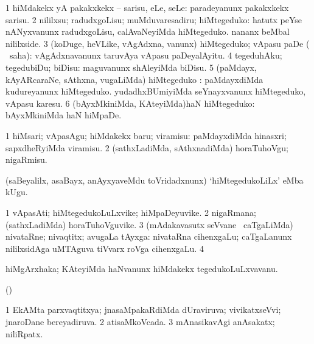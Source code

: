 {{{{{{\bentry
{} 
\gl{\sakirx}
\expl{}
\bmng
\bnum
\num{1} hiMdakekx yA pakakxkekx -- sarisu, eLe, seLe:  paradeyanunx pakakxkekx sarisu. 
\num{2} nililxsu; radudxgoLisu; muMduvaresadiru; hiMtegeduko:  hatutx peYse nANyxvanunx radudxgoLisu, calAvaNeyiMda hiMtegeduko.  nananx beMbal nililxside. 
\num{3} (koDuge, heVLike, vAgAdxna, \mo vanunx) hiMtegeduko; vApasu paDe ( \akirx\ saha):  vAgAdxnavanunx taruvAya vApasu paDeyalAyitu. 
\num{4} tegeduhAku; tegedubiDu; biDisu:  maguvanunx shAleyiMda biDisu. 
\num{5} (paMdayx, kAyARcaraNe, sAthxna, \mo vugaLiMda) hiMtegeduko :  paMdayxdiMda kudureyanunx hiMtegeduko.  yudadhxBUmiyiMda seYnayxvanunx hiMtegeduko, vApasu karesu. 
\num{6} (bAyxMkiniMda, KAteyiMda)haN hiMtegeduko:  bAyxMkiniMda haN hiMpaDe. 
\enum
\emng

\noindent
\gl{\akirx}
\expl{}
\bmng
\bnum
\num{1} hiMsari; vApasAgu; hiMdakekx baru; viramisu:  paMdayxdiMda hinasxri; sapxdheRyiMda viramisu. 
\num{2} (sathxLadiMda, sAthxnadiMda) horaTuhoVgu; nigaRmisu. 
\enum
\emng

\noindent
\gl{\pagu}
\expl{}
\bmng
{} (saBeyalilx, asaBayx, anAyxyaveMdu toVridadxnunx) `hiMtegedukoLiLx' eMba kUgu. 
\emng
\eentry

\bentry 
{} 
\gl{\nA}
\expl{}
\bmng
\bnum
\num{1} vApasAti; hiMtegedukoLuLxvike; hiMpaDeyuvike. 
\num{2} nigaRmana; (sathxLadiMda) horaTuhoVguvike. 
\num{3} (mAdakavasutx seVvane \mo\ caTgaLiMda) nivataRne; nivaqtitx; avugaLa tAyxga:  nivataRna cihenxgaLu; caTgaLanunx nililxsidAga uMTAguva tiVvarx roVga cihenxgaLu. 
\num{4}  
\enum
\emng
\eentry

\bentry
{} 
\gl{\nA}
\expl{}
\bmng
hiMgArxhaka; KAteyiMda haNvanunx hiMdakekx tegedukoLuLxvavanu. 
\emng
\eentry

\bentry
{} 
\gl{\nA}
\bmng
 (\pArxparx) 
\emng
\eentry

\bentry
{} 
\gl{\gu}
\expl{}
\bmng
\bnum
\num{1} EkAMta parxvaqtitxya; jnasaMpakaRdiMda dUraviruva; vivikatxseVvi; jnaroDane bereyadiruva. 
\num{2} atisaMkoVcada. 
\num{3} mAnasikavAgi anAsakatx; niliRpatx. 
\enum
\emng
\eentry

}}}}}}
